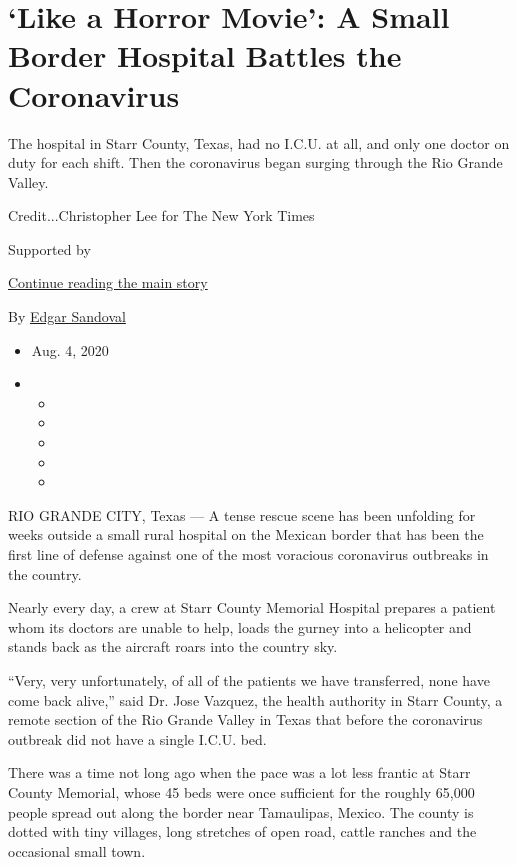 \hypertarget{like-a-horror-movie-a-small-border-hospital-battles-the-coronavirus}{%
\section{`Like a Horror Movie': A Small Border Hospital Battles the
Coronavirus}\label{like-a-horror-movie-a-small-border-hospital-battles-the-coronavirus}}

The hospital in Starr County, Texas, had no I.C.U. at all, and only one
doctor on duty for each shift. Then the coronavirus began surging
through the Rio Grande Valley.

Credit...Christopher Lee for The New York Times

Supported by

\protect\hyperlink{after-sponsor}{Continue reading the main story}

By \href{https://www.nytimes3xbfgragh.onion/by/edgar-sandoval}{Edgar
Sandoval}

\begin{itemize}
\item
  Aug. 4, 2020
\item
  \begin{itemize}
  \item
  \item
  \item
  \item
  \item
  \end{itemize}
\end{itemize}

RIO GRANDE CITY, Texas --- A tense rescue scene has been unfolding for
weeks outside a small rural hospital on the Mexican border that has been
the first line of defense against one of the most voracious coronavirus
outbreaks in the country.

Nearly every day, a crew at Starr County Memorial Hospital prepares a
patient whom its doctors are unable to help, loads the gurney into a
helicopter and stands back as the aircraft roars into the country sky.

``Very, very unfortunately, of all of the patients we have transferred,
none have come back alive,'' said Dr. Jose Vazquez, the health authority
in Starr County, a remote section of the Rio Grande Valley in Texas that
before the coronavirus outbreak did not have a single I.C.U. bed.

There was a time not long ago when the pace was a lot less frantic at
Starr County Memorial, whose 45 beds were once sufficient for the
roughly 65,000 people spread out along the border near Tamaulipas,
Mexico. The county is dotted with tiny villages, long stretches of open
road, cattle ranches and the occasional small town.

